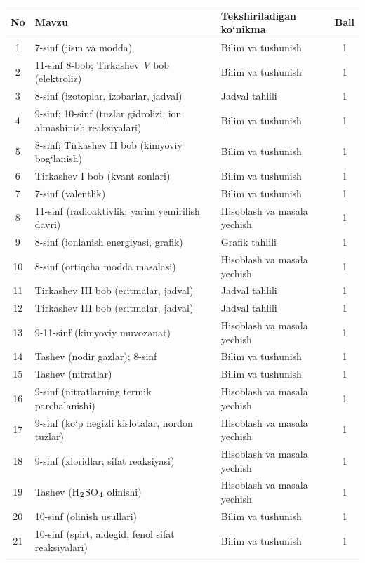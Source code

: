 \documentclass[11pt,a4paper]{article}
\renewcommand{\textsubscript}[1]{\ensuremath{_{\text{\fontsize{8}{8}\selectfont #1}}}}
\begin{document}
{\small\noindent\begin{longtable}{|c|p{7.2cm}|p{5.4cm}|c|}\hline \textbf{No} & \textbf{Mavzu} & \textbf{Tekshiriladigan ko`nikma} & \textbf{Ball}\\\hline
1 & 7-sinf (jism va modda) & Bilim va tushunish & 1\\\hline
2 & 11-sinf 8-bob; Tirkashev \textit{V} bob (elektroliz) & Bilim va tushunish & 1\\\hline
3 & 8-sinf (izotoplar, izobarlar, jadval) & Jadval tahlili & 1\\\hline
4 & 9-sinf; 10-sinf (tuzlar gidrolizi, ion almashinish reaksiyalari) & Bilim va tushunish & 1\\\hline
5 & 8-sinf; Tirkashev II bob (kimyoviy bog`lanish) & Bilim va tushunish & 1\\\hline
6 & Tirkashev I bob (kvant sonlari) & Bilim va tushunish & 1\\\hline
7 & 7-sinf (valentlik) & Bilim va tushunish & 1\\\hline
8 & 11-sinf (radioaktivlik; yarim yemirilish davri) & Hisoblash va masala yechish & 1\\\hline
9 & 8-sinf (ionlanish energiyasi, grafik) & Grafik tahlili & 1\\\hline
10 & 8-sinf (ortiqcha modda masalasi) & Hisoblash va masala yechish & 1\\\hline
11 & Tirkashev III bob (eritmalar, jadval) & Jadval tahlili & 1\\\hline
12 & Tirkashev III bob (eritmalar, jadval) & Jadval tahlili & 1\\\hline
13 & 9-11-sinf (kimyoviy muvozanat) & Hisoblash va masala yechish & 1\\\hline
14 & Tashev (nodir gazlar); 8-sinf & Bilim va tushunish & 1\\\hline
15 & Tashev (nitratlar) & Bilim va tushunish & 1\\\hline
16 & 9-sinf (nitratlarning termik parchalanishi) & Hisoblash va masala yechish & 1\\\hline
17 & 9-sinf (ko`p negizli kislotalar, nordon tuzlar) & Hisoblash va masala yechish & 1\\\hline
18 & 9-sinf (xloridlar; sifat reaksiyasi) & Hisoblash va masala yechish & 1\\\hline
19 & Tashev (H\textsubscript{2}SO\textsubscript{4} olinishi) & Hisoblash va masala yechish & 1\\\hline
20 & 10-sinf (olinish usullari) & Bilim va tushunish & 1\\\hline
21 & 10-sinf (spirt, aldegid, fenol sifat reaksiyalari) & Bilim va tushunish & 1\\\hline

\end{longtable}}
\end{document}
